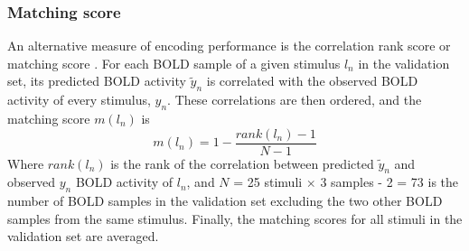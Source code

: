 \subsubsection*{Matching score}
%
An alternative measure of encoding performance is the correlation rank score or matching score \citep{SF14}. For each BOLD sample of a given stimulus $l_{n}$ in the validation set, its predicted BOLD activity $\widetilde{y}_{n}$ is correlated with the observed BOLD activity of every stimulus, $y_{n}$.
These correlations are then ordered, and the  matching score $m(l_{n})$ is \[m(l_{n}) = 1-\frac{rank(l_{n})-1}{N-1} \] Where $rank(l_{n})$ is the rank of the correlation between predicted $\widetilde{y}_{n}$ and observed $y_{n}$ BOLD activity of $l_{n}$, and $N$ = 25 stimuli $\times$ 3 samples - 2 = 73 is the number of BOLD samples in the validation set excluding the two other BOLD samples from the same stimulus.
Finally, the matching scores for all stimuli in the validation set are averaged.

